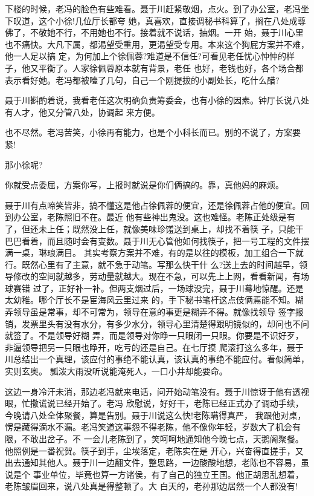 \documentclass[11pt,a4paper,onecolumn]{article}
\begin{document}
下楼的时候，老冯的脸色有些难看。聂于川赶紧敬烟，点火。到了办公室，老冯坐下叹道，这个小徐!几位厅长都夸
她，真喜欢，直接调秘书科算了，搁在八处成尊佛了，不敬她不行，不用她也不行。接着就不说话，抽烟。一开
始，聂于川心里也不痛快。大凡下属，都渴望受重用，更渴望受专用。本来这个狗屁方案并不难，他一人足以搞
定，为何加上个徐佩蓉?难道是不信任?可看见老任忧心忡忡的样子，他又平衡了。人家徐佩蓉原本就有背景，老任
也好，老钱也好，各个场合都表示看好她。老冯都被噎了几句，自己一个刚提拔的小副处长，吃什么醋?

聂于川斟酌着说，我看老任这次明确负责筹委会，也有小徐的因素。钟厅长说八处有人才，他又分管八处，协调起
来方便。

也不尽然。老冯苦笑，小徐再有能力，也是个小科长而已。别的不说了，方案要紧!

那小徐呢?

你就受点委屈，方案你写，上报时就说是你们俩搞的。靠，真他妈的麻烦。

聂于川有点啼笑皆非，搞不懂这是他占徐佩蓉的便宜，还是徐佩蓉占他的便宜。回到办公室，老陈照旧不在。最近
他有些神出鬼没。这也难怪。老陈正处级是有了，但还未上任；既然没上任，就像美味珍馐送到桌上，却找不着筷
子，只能干巴巴看着，而且随时会有变数。聂于川无心管他如何找筷子，把一号工程的文件摆满一桌，琳琅满目。
其实考察方案并不难，有的是以往的模板，加工组合一下就行。既然心里有了主意，就不急于动笔。写那么快干什
么?送上去的时间越早，领导修改的空间就越多，劳动量就越大。现在不急，可以先上上网，看看新闻，有场球赛错
过了，正好补一补。但两支烟过后，一场球没完，聂于川蓦地惊醒。还是太幼稚。哪个厅长不是宦海风云里过来
的，手下秘书笔杆这点伎俩焉能不知。糊弄领导虽是常事，却不可常为，领导在意的事更是糊弄不得。就像找领导
签字报销，发票里头有没有水分，有多少水分，领导心里清楚得跟明镜似的，却问也不问就签了。不是领导好糊
弄，而是领导对你睁一只眼闭一只眼。你要是不识好歹，非逼领导把另一只眼也睁开，吃亏的还是自己。在七厅摸
爬滚打这么多年，聂于川总结出一个真理，该应付的事绝不能认真，该认真的事绝不能应付。看似简单，实则玄奥。
瓢泼大雨没听说能淹死人，一口小井却能要命。

这边一身冷汗未消，那边老冯就来电话，问开始动笔没有。聂于川惊讶于他有透视眼，忙撒谎说已经开始了。老冯
欣慰说，好好干，老陈已经正式办了调动手续，今晚请八处全体聚餐，算是告别。聂于川说这么快!老陈瞒得真严，
我跟他对桌，愣是藏得滴水不漏。老冯笑道这事怨不得老陈，他不像你年轻，岁数大了机会有限，不敢出岔子。不
一会儿老陈到了，笑呵呵地通知他今晚七点，天鹅阁聚餐。他照例是一番祝贺。筷子到手，尘埃落定，老陈实在是
开心，兴奋得直搓手，又出去通知其他人。聂于川一边翻文件，整思路，一边酸酸地想，老陈也不容易，虽说是个
事业单位，毕竟也算一方诸侯，有了自己的独立王国。他正胡思乱想着，老陈皱眉回来，说八处真是得整顿了。大
白天的，老孙那边居然一个人都没有!
\end{document}
